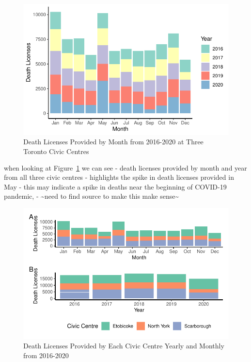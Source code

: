 \documentclass[
  letterpaper,
  DIV=11,
  numbers=noendperiod]{scrartcl}
\begin{document}
\begin{figure}

\caption{\label{fig-2}Death Licenses Provided by Month from 2016-2020 at
Three Toronto Civic Centres}

{\centering \includegraphics{paper_files/figure-pdf/fig-2-1.pdf}

}

\end{figure}

when looking at Figure~\ref{fig-2} we can see - death licenses provided
by month and year from all three civic centres - highlights the spike in
death licenses provided in May - this may indicate a spike in deaths
near the beginning of COVID-19 pandemic, - \textasciitilde need to find
source to make this make sense\textasciitilde{}

\begin{figure}

\caption{\label{fig-3}Death Licenses Provided by Each Civic Centre
Yearly and Monthly from 2016-2020}

{\centering \includegraphics{paper_files/figure-pdf/fig-3-1.pdf}

}

\end{figure}
\end{document}

